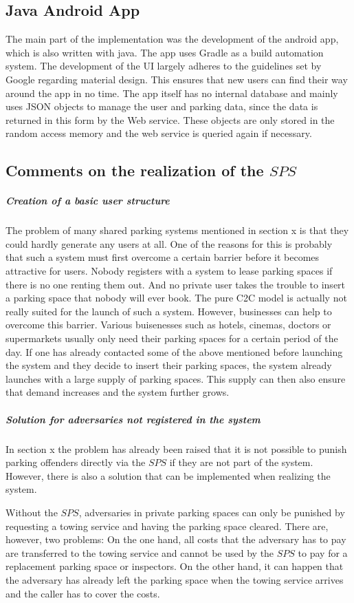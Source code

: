 \documentclass[
a4paper,     %
titlepage,   %
14pt         %
]{scrartcl}  %
\theoremstyle{mystyle}
\begin{document}
\subsection{Java Android App}
The main part of the implementation was the development of the android app, which is also written with java. The app uses Gradle as a build automation system. The development of the UI largely adheres to the guidelines set by Google regarding material design. This ensures that new users can find their way around the app in no time. The app itself has no internal database and mainly uses JSON objects to manage the user and parking data, since the data is returned in this form by the Web service. These objects are only stored in the random access memory and the web service is queried again if necessary.

\subsection{Comments on the realization of the $SPS$}

\subparagraph{Creation of a basic user structure}
The problem of many shared parking systems mentioned in section x is that they could hardly generate any users at all. One of the reasons for this is probably that such a system must first overcome a certain barrier before it becomes attractive for users. Nobody registers with a system to lease parking spaces if there is no one renting them out. And no private user takes the trouble to insert a parking space that nobody will ever book. The pure C2C model is actually not really suited for the launch of such a system. However, businesses can help to overcome this barrier. Various buisenesses such as hotels, cinemas, doctors or supermarkets usually only need their parking spaces for a certain period of the day. If one has already contacted some of the above mentioned before launching the system and they decide to insert their parking spaces, the system already launches with a large supply of parking spaces. This supply can then also ensure that demand increases and the system further grows.

\subparagraph{Solution for adversaries not registered in the system}
In section x the problem has already been raised that it is not possible to punish parking offenders directly via the $SPS$ if they are not part of the system. However, there is also a solution that can be implemented when realizing the system.

Without the $SPS$, adversaries in private parking spaces can only be punished by requesting a towing service and having the parking space cleared. There are, however, two problems: On the one hand, all costs that the adversary has to pay are transferred to the towing service and cannot be used by the $SPS$ to pay for a replacement parking space or inspectors. On the other hand, it can happen that the adversary has already left the parking space when the towing service arrives and the caller has to cover the costs.
\end{document}
